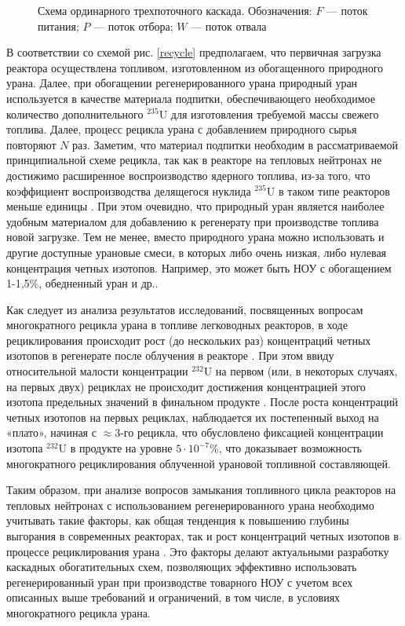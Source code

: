 \begin{figure}[ht]
  \caption{Схема ординарного трехпоточного каскада. Обозначения: $F$ --- поток питания; $P$ --- поток отбора; $W$ --- поток отвала}\label{ordinary}
\end{figure}

В соответствии со схемой рис. \ref{recycle} предполагаем, что первичная загрузка реактора осуществлена топливом, изготовленном из обогащенного природного урана. Далее, при обогащении регенерированного урана природный уран используется в качестве материала подпитки, обеспечивающего необходимое количество дополнительного $^{235}$U для изготовления требуемой массы свежего топлива. Далее, процесс рецикла урана с добавлением природного сырья повторяют $N$ раз. Заметим, что материал подпитки необходим в рассматриваемой принципиальной схеме рецикла, так как в реакторе на тепловых нейтронах не достижимо расширенное воспроизводство ядерного топлива, из-за того, что коэффициент воспроизводства делящегося нуклида $^{235}$U в таком типе реакторов меньше единицы \cite{ignatevVliyanieVidaTopliva2020}. При этом очевидно, что природный уран является наиболее удобным материалом для добавлению к регенерату при производстве топлива новой загрузке. Тем не менее, вместо природного урана можно использовать и другие доступные урановые смеси, в которых либо очень низкая, либо нулевая концентрация четных изотопов. Например, это может быть НОУ с обогащением 1-1,5\%, обедненный уран и др..


Как следует из анализа результатов исследований, посвященных вопросам многократного рецикла урана в топливе легководных реакторов, в ходе рециклирования происходит рост (до нескольких раз) концентраций четных изотопов в регенерате после облучения в реакторе \cite{smirnovEvolutionIsotopicComposition2012}. При этом ввиду относительной малости концентрации $^{232}$U на первом (или, в некоторых случаях, на первых двух) рециклах не происходит достижения концентрацией этого изотопа предельных значений в финальном продукте \cite{smirnovApplyingEnrichmentCapacities2018}.
После роста концентраций четных изотопов на первых рециклах, наблюдается их постепенный выход на «плато», начиная с $\approx$3-го рецикла, что обусловлено фиксацией концентрации изотопа $^{232}$U в продукте на уровне $5\cdot10^{-7}$\%, что доказывает возможность многократного рециклирования облученной урановой топливной составляющей.

Таким образом, при анализе вопросов замыкания топливного цикла реакторов на тепловых нейтронах с использованием регенерированного урана необходимо учитывать такие факторы, как общая тенденция к повышению глубины выгорания в современных реакторах, так и рост концентраций четных изотопов в процессе рециклирования урана \cite{andrianovaPovyshenieVygoraniyaTopliva2008}. Это факторы делают актуальными разработку каскадных обогатительных схем, позволяющих эффективно использовать регенерированный уран при производстве товарного НОУ с учетом всех описанных выше требований и ограничений, в том числе, в условиях многократного рецикла урана.

